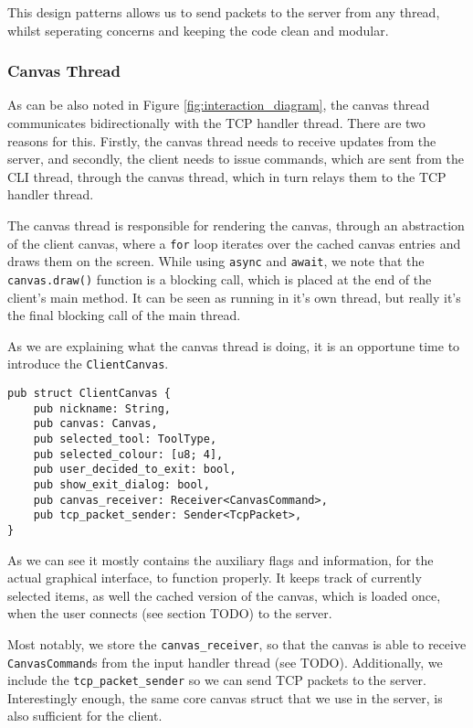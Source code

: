 \documentclass{article}
\newcommand{\code}[1]{\texttt{#1}}
\begin{document}
This design patterns allows us to send packets to the server from any thread,
whilst seperating concerns and keeping the code clean and modular.

\subsubsection{Canvas Thread}

As can be also noted in Figure \ref{fig:interaction_diagram}, the canvas thread
communicates bidirectionally with the TCP handler thread. There are two reasons
for this. Firstly, the canvas thread needs to receive updates from the server,
and secondly, the client needs to issue commands, which are sent from the CLI
thread, through the canvas thread, which in turn relays them to the TCP handler
thread.

The canvas thread is responsible for rendering the canvas, through an
abstraction of the client canvas, where a \code{for} loop iterates over the
cached canvas entries and draws them on the screen. While using \code{async} and
\code{await}, we note that the \code{canvas.draw()} function is a blocking call,
which is placed at the end of the client's main method. It can be seen as
running in it's own thread, but really it's the final blocking call of the main
thread.

As we are explaining what the canvas thread is doing, it is an opportune time to introduce the \code{ClientCanvas}.

\begin{subbox}{}
    \lstset{xleftmargin=0\textwidth, xrightmargin=0\textwidth}
    \begin{lstlisting}
pub struct ClientCanvas {
    pub nickname: String,
    pub canvas: Canvas,
    pub selected_tool: ToolType,
    pub selected_colour: [u8; 4],
    pub user_decided_to_exit: bool,
    pub show_exit_dialog: bool,
    pub canvas_receiver: Receiver<CanvasCommand>,
    pub tcp_packet_sender: Sender<TcpPacket>,
}
    \end{lstlisting}
\end{subbox}

As we can see it mostly contains the auxiliary flags and information, for the
actual graphical interface, to function properly. It keeps track of currently
selected items, as well the cached version of the canvas, which is loaded once,
when the user connects (see section TODO) to the server.

Most notably, we store the \code{canvas\_receiver}, so that the canvas is able
to receive \code{CanvasCommand}s from the input handler thread (see TODO).
Additionally, we include the \code{tcp\_packet\_sender} so we can send TCP
packets to the server. Interestingly enough, the same core canvas struct that we
use in the server, is also sufficient for the client.
\end{document}
